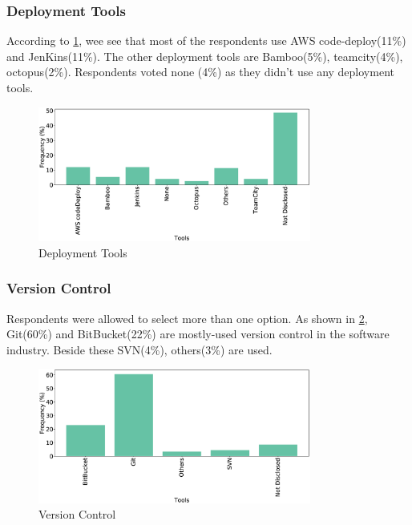 \subsubsection{Deployment Tools}
According to \cref{fig:deployTools}, wee see that most of the respondents use AWS code-deploy(11\%) and JenKins(11\%). The other deployment tools are Bamboo(5\%), teamcity(4\%), octopus(2\%). Respondents voted none (4\%) as they didn’t use any deployment tools.
\begin{figure}[]
\centering
  \includegraphics[width=0.8\textwidth]{Figures/Respondents_deployment_tools}
  \caption{Deployment Tools}
  \label{fig:deployTools}
\end{figure}

\subsubsection{Version Control}
Respondents were allowed to select more than one option. As shown in \cref{fig:versionControl}, Git(60\%) and BitBucket(22\%) are mostly-used version control in the software industry. Beside these SVN(4\%), others(3\%) are used.
\begin{figure}[]
\centering
  \includegraphics[width=0.8\textwidth]{Figures/Respondents_version_control}
  \caption{Version Control}
  \label{fig:versionControl}
\end{figure}